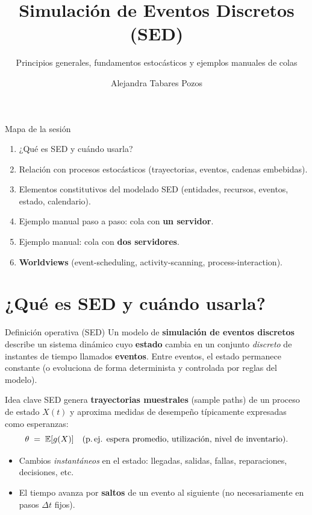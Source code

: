 \documentclass[aspectratio=1610, 9pt]{beamer}
\title[Simulación de Eventos Discretos (SE…]{Simulación de Eventos Discretos (SED)}
\subtitle{Principios generales, fundamentos estocásticos y ejemplos manuales de colas}
\author{Alejandra Tabares Pozos}
\institute{Universidad de los Andes \\
 Departamento de Ingeniería Industrial}
\date{}
\begin{document}
\begin{frame}
  \titlepage
\end{frame}

\begin{frame}{Mapa de la sesión}
\small
\begin{enumerate}
\item ¿Qué es SED y cuándo usarla?
\item Relación con procesos estocásticos (trayectorias, eventos, cadenas embebidas).
\item Elementos constitutivos del modelado SED (entidades, recursos, eventos, estado, calendario).
\item Ejemplo manual paso a paso: cola con \textbf{un servidor}.
\item Ejemplo manual: cola con \textbf{dos servidores}.
\item \textbf{Worldviews} (event-scheduling, activity-scanning, process-interaction).
\end{enumerate}
\end{frame}

\section{¿Qué es SED y cuándo usarla?}

\begin{frame}{Definición operativa (SED)}
\small
Un modelo de \textbf{simulación de eventos discretos} describe un sistema dinámico cuyo \textbf{estado} cambia en un conjunto \emph{discreto} de instantes de tiempo llamados \textbf{eventos}. Entre eventos, el estado permanece constante (o evoluciona de forma determinista y controlada por reglas del modelo).

\vspace{6pt}
\begin{block}{Idea clave}
SED genera \textbf{trayectorias muestrales} (sample paths) de un proceso de estado $X(t)$ y aproxima medidas de desempeño típicamente expresadas como esperanzas:
\[
\theta \;=\; \mathbb{E}[g(X)] \quad \text{(p.\,ej. espera promedio, utilización, nivel de inventario).}
\]
\end{block}

\vspace{4pt}
\begin{itemize}
\item Cambios \emph{instantáneos} en el estado: llegadas, salidas, fallas, reparaciones, decisiones, etc.
\item El tiempo avanza por \textbf{saltos} de un evento al siguiente (no necesariamente en pasos $\Delta t$ fijos).
\end{itemize}
\end{frame}
\end{document}
